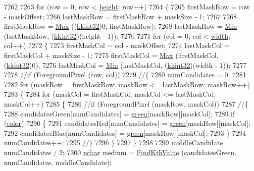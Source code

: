 \begin{DoxyCode}
7262   
7263   \textcolor{keywordflow}{for}  (row = 0;  row < \hyperlink{class_k_k_b_1_1_raster_af39ff189de4fbb6de98392e187efafb7}{height};  row++)
7264   \{
7265     firstMaskRow = row - maskOffset;
7266     lastMaskRow  = firstMaskRow + maskSize - 1;
7267 
7268     firstMaskRow = \hyperlink{namespace_k_k_b_a25e187e24c091586293725f27f007ad7}{Max} ((\hyperlink{namespace_k_k_b_a8fa4952cc84fda1de4bec1fbdd8d5b1b}{kkint32})0, firstMaskRow);
7269     lastMaskRow  = \hyperlink{namespace_k_k_b_ad030d1ca8bd5038824c4a923a4d23fb5}{Min} (lastMaskRow, (\hyperlink{namespace_k_k_b_a8fa4952cc84fda1de4bec1fbdd8d5b1b}{kkint32})(height - 1));
7270     
7271     \textcolor{keywordflow}{for}  (col = 0;  col < \hyperlink{class_k_k_b_1_1_raster_ae0bcc103e191c3421d7692dc69ceb554}{width};  col++)
7272     \{
7273       firstMaskCol = col - maskOffset;
7274       lastMaskCol = firstMaskCol + maskSize - 1;
7275       firstMaskCol = \hyperlink{namespace_k_k_b_a25e187e24c091586293725f27f007ad7}{Max} (firstMaskCol, (\hyperlink{namespace_k_k_b_a8fa4952cc84fda1de4bec1fbdd8d5b1b}{kkint32})0);
7276       lastMaskCol  = \hyperlink{namespace_k_k_b_ad030d1ca8bd5038824c4a923a4d23fb5}{Min} (lastMaskCol,  (\hyperlink{namespace_k_k_b_a8fa4952cc84fda1de4bec1fbdd8d5b1b}{kkint32})(width - 1));
7277 
7278       \textcolor{comment}{//if  (ForegroundPixel (row, col))}
7279       \textcolor{comment}{//\{}
7280         numCandidates = 0;
7281 
7282         \textcolor{keywordflow}{for}  (maskRow = firstMaskRow;  maskRow <= lastMaskRow;  maskRow++)
7283         \{
7284           \textcolor{keywordflow}{for}  (maskCol = firstMaskCol;  maskCol <= lastMaskCol;  maskCol++)
7285           \{
7286             \textcolor{comment}{//if  (ForegroundPixel (maskRow, maskCol))}
7287             \textcolor{comment}{//\{}
7288               candidatesGreen[numCandidates] = \hyperlink{class_k_k_b_1_1_raster_a2d2238911145488e226cd2e34fc8448c}{green}[maskRow][maskCol];
7289               \textcolor{keywordflow}{if}  (\hyperlink{class_k_k_b_1_1_raster_a482384d89cc53fa4f36276307c746854}{color})
7290               \{
7291                 candidatesRed[numCandidates]  = \hyperlink{class_k_k_b_1_1_raster_a2d2238911145488e226cd2e34fc8448c}{green}[maskRow][maskCol];
7292                 candidatesBlue[numCandidates] = \hyperlink{class_k_k_b_1_1_raster_a2d2238911145488e226cd2e34fc8448c}{green}[maskRow][maskCol];
7293               \}
7294               numCandidates++;
7295             \textcolor{comment}{//\}}
7296           \}
7297         \}
7298 
7299         middleCandidate = numCandidates / 2;
7300         \hyperlink{namespace_k_k_b_ace9969169bf514f9ee6185186949cdf7}{uchar}  medium = \hyperlink{_raster_8cpp_a87f66b9005f9f4224fa1c553fe5f122f}{FindKthValue} (candidatesGreen, numCandidates, middleCandidate);

\end{DoxyCode}
